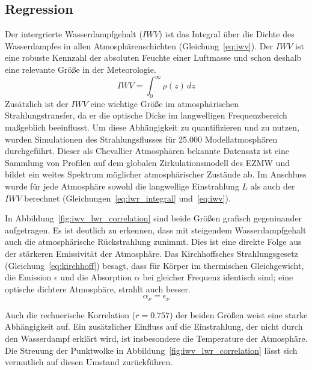\documentclass[10pt,a4paper,compsoc,peer review papers]{IEEEtran}
\begin{document}
\subsection{Regression}\label{subsec:iwv_regression}
Der intergrierte Wasserdampfgehalt ($IWV$) ist das Integral über die Dichte des
Wasserdampfes in allen Atmosphärenschichten (Gleichung~\ref{eq:iwv}). Der $IWV$
ist eine robuste Kennzahl der absoluten Feuchte einer Luftmasse und schon
deshalb eine relevante Größe in der Meteorologie.
\begin{equation}\label{eq:iwv}
  IWV = \int_0^\infty \rho(z) \, dz
\end{equation}
Zusätzlich ist der $IWV$ eine wichtige Größe im atmosphärischen
Strahlungstransfer, da er die optische Dicke im langwelligen Frequenzbereich
maßgeblich beeinflusst. Um diese Abhängigkeit zu quantifizieren und zu nutzen,
wurden Simulationen des Strahlungsflusses für 25.000 Modellatmosphären
durchgeführt. Dieser als Chevallier \cite{Chevallier2006} Atmosphären bekannte
Datensatz ist eine Sammlung von Profilen auf dem globalen Zirkulationsmodell
des EZMW und bildet ein weites Spektrum möglicher atmosphärischer Zustände ab.
Im Anschluss wurde für jede Atmosphäre sowohl die langwellige Einstrahlung $L$
als auch der $IWV$ berechnet (Gleichungen~\ref{eq:lwr_integral}
und~\ref{eq:iwv}). 

In Abbildung~\ref{fig:iwv_lwr_correlation} sind beide Größen grafisch gegeninander
aufgetragen. Es ist deutlich zu erkennen, dass mit steigendem Wasserdampfgehalt
auch die atmosphärische Rückstrahlung zunimmt. Dies ist eine direkte Folge aus
der stärkeren Emissivität der Atmosphäre. Das Kirchhoffsches Strahlungsgesetz
(Gleichung~\ref{eq:kirchhoff}) besagt, dass für Körper im thermischen
Gleichgewicht, die Emission $\epsilon$ und die Absorption $\alpha$ bei gleicher
Frequenz identisch sind; eine optische dichtere Atmosphäre, strahlt auch besser.
\begin{equation}\label{eq:kirchhoff}
  \alpha_\nu = \epsilon_\nu
\end{equation}

Auch die rechnerische Korrelation ($r = 0.757$) der beiden Größen weist eine
starke Abhängigkeit auf. Ein zusätzlicher Einfluss auf die Einstrahlung,
der nicht durch den Wasserdampf erklärt wird, ist insbesondere die Temperature
der Atmosphäre. Die Streuung der Punktwolke in
Abbildung~\ref{fig:iwv_lwr_correlation} lässt sich vermutlich auf diesen
Umstand zurückführen.
\end{document}
